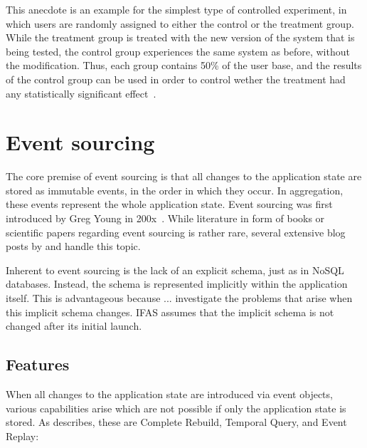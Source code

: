 This anecdote is an example for the simplest type of controlled experiment, in which users are randomly assigned to either the control or the treatment group.
While the treatment group is treated with the new version of the system that is being tested, the control group experiences the same system as before, without the modification.
Thus, each group contains 50\% of the user base, and the results of the control group can be used in order to control wether the treatment had any statistically significant effect~\cite{Kohavi2009}.

\section{Event sourcing}
\label{sec:fundamentals:event}

The core premise of event sourcing is that all changes to the application state are stored as immutable events, in the order in which they occur.
In aggregation, these events represent the whole application state.
Event sourcing was first introduced by Greg Young in 200x~\cite{???}.
While literature in form of books or scientific papers regarding event sourcing is rather rare, several extensive blog posts by \citet{WEB:Fowler:2005} and \citet{Todo:WEB:Young:200x} handle this topic.

Inherent to event sourcing is the lack of an explicit schema, just as in NoSQL databases\cite{?}.
Instead, the schema is represented implicitly within the application itself.
This is advantageous because ...
\citet{Overeem2017} investigate the problems that arise when this implicit schema changes.
\ac{IFAS} assumes that the implicit schema is not changed after its initial launch.

\subsection{Features}

When all changes to the application state are introduced via event objects, various capabilities arise which are not possible if only the application state is stored.
As \citet{WEB:Fowler:2005} describes, these are Complete Rebuild, Temporal Query, and Event Replay:

